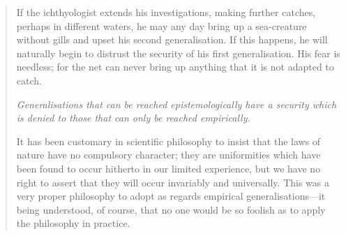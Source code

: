 \begin{quote}
    If the ichthyologist extends his investigations, making further catches, perhaps in different waters, he may any day bring up a sea-creature without gills and upset his second generalisation.  If this happens, he will naturally begin to distrust the security of his first generalisation.  His fear is needless; for the net can never bring up anything that it is not adapted to catch.
    
    \emph{Generalisations that can be reached epistemologically have a security which is denied to those that can only be reached empirically.}
    
    It has been customary in scientific philosophy to insist that the laws of nature have no compulsory character; they are uniformities which have been found to occur hitherto in our limited experience, but we have no right to assert that they will occur invariably and universally.  This was a very proper philosophy to adopt as regards empirical generalisations---it being understood, of course, that no one would be so foolish as to apply the philosophy in practice.  
    
    \citep[p. 19]{Eddington1939}
\end{quote}


